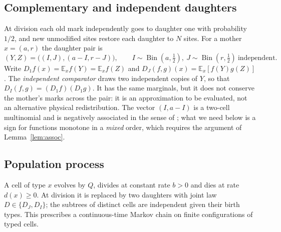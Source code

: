 \documentclass[11pt]{article}
\theoremstyle{remark}
\newcommand{\E}{\mathbb E}
\newcommand{\Bin}{\operatorname{Bin}}
\begin{document}
\subsection{Complementary and independent daughters}
At division each old mark independently goes to daughter one with probability
$1/2$, and new unmodified sites restore each daughter to $N$ sites. For a
mother $x=(a,r)$ the daughter pair is
\begin{equation}\label{eq:partition}
 (Y,Z)=\bigl((I,J),(a-I,r-J)\bigr),\qquad I\sim\Bin(a,\tfrac12),\ J\sim\Bin(r,\tfrac12)\ \text{independent}.
\end{equation}
Write $D_1f(x)=\E_xf(Y)=\E_xf(Z)$ and $D_J(f,g)(x)=\E_x[f(Y)g(Z)]$. The
\emph{independent comparator} draws two independent copies of $Y$, so that
$D_I(f,g)=(D_1f)(D_1g)$. It has the same marginals, but it does not conserve
the mother's marks across the pair: it is an approximation to be evaluated,
not an alternative physical redistribution. The vector $(I,a-I)$ is a
two-cell multinomial and is negatively associated in the sense of
\cite{joagdev1983}; what we need below is a sign for functions monotone in a
\emph{mixed} order, which requires the argument of Lemma~\ref{lem:assoc}.

\subsection{Population process}
A cell of type $x$ evolves by $Q$, divides at constant rate $b>0$ and dies at
rate $d(x)\ge0$. At division it is replaced by two daughters with joint law
$D\in\{D_J,D_I\}$; the subtrees of distinct cells are independent given their
birth types. This prescribes a continuous-time Markov chain on finite
configurations of typed cells.
\end{document}
